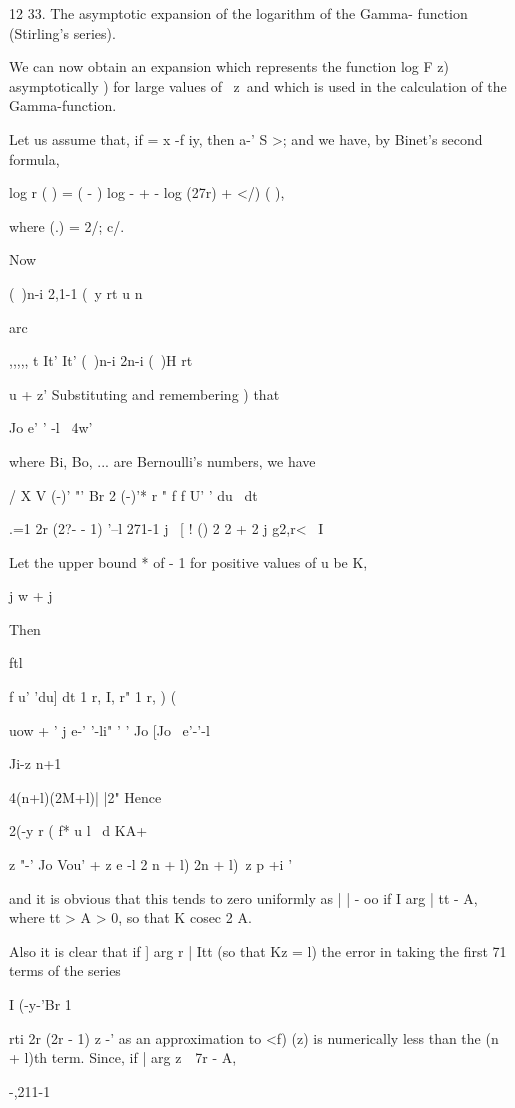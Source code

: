 12 33. The asymptotic expansion of the logarithm of the Gamma-
function (Stirling's series).

We can now obtain an expansion which represents the function log F z)
asymptotically ) for large values of \ z\, and which is used in
the calculation of the Gamma-function.

Let us assume that, if = x -f iy, then a-' S >; and we have, by
Binet's second formula,

log r ( ) = ( - ) log - + - log (27r) + </) ( ),

where (.) = 2/; c/.

Now

(\ )n-i 2,1-1 (\ y rt u n

arc

,,,,, t It' It' (\ )n-i 2n-i (\ )H rt

u + z' Substituting and remembering ) that

Jo e' ' -l ~4w'

%
%

where Bi, Bo, ... are Bernoulli's numbers, we have

  / X V (-)' "' Br 2 (-)'* r " f f U' ' du \ dt

.=1 2r (2?- - 1) '--l 271-1 j \ [ ! () 2 2 + 2 j g2,r< \ I

Let the upper bound * of - 1 for positive values of u be K,

j w + j

Then

ftl

f u' 'du] dt 1 r, I, r" 1 r, ) (

uow + ' j e-' '-li" ' ' Jo [Jo \ e'-'-l

Ji-z n+1

 4(n+l)(2M+l)| |2" Hence

2(-y r ( f* u l \ d KA+

z "-' Jo Vou' + z e -l 2 n + l) 2n + l)\ z p +i '

and it is obvious that this tends to zero uniformly as | | - oo if I
arg | tt - A, where tt > A > 0, so that K cosec 2 A.

Also it is clear that if ] arg r | Itt (so that Kz = l) the error in
taking the first 71 terms of the series

I (-y-'Br 1

rti 2r (2r - 1) z -' as an approximation to <f) (z) is numerically
less than the (n + l)th term. Since, if | arg z\ \ 7r - A,

-,211-1

